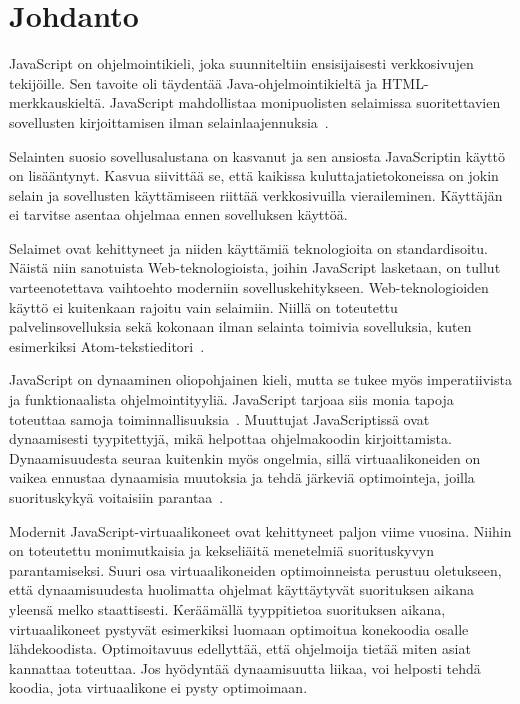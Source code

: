 \section{Johdanto}

JavaScript on ohjelmointikieli, joka suunniteltiin ensisijaisesti verkkosivujen tekijöille. Sen tavoite oli täydentää Java-ohjelmointikieltä ja HTML-merkkauskieltä. JavaScript mahdollistaa monipuolisten selaimissa suoritettavien sovellusten kirjoittamisen ilman selainlaajennuksia~\cite{paolini1994netscape}.

Selainten suosio sovellusalustana on kasvanut ja sen ansiosta JavaScriptin käyttö on lisääntynyt. Kasvua siivittää se, että kaikissa kuluttajatietokoneissa on jokin selain ja sovellusten käyttämiseen riittää verkkosivuilla vieraileminen. Käyttäjän ei tarvitse asentaa ohjelmaa ennen sovelluksen käyttöä.

Selaimet ovat kehittyneet ja niiden käyttämiä teknologioita on standardisoitu. Näistä niin sanotuista Web-teknologioista, joihin JavaScript lasketaan, on tullut varteenotettava vaihtoehto moderniin sovelluskehitykseen. Web-teknologioiden käyttö ei kuitenkaan rajoitu vain selaimiin. Niillä on toteutettu palvelinsovelluksia sekä kokonaan ilman selainta toimivia sovelluksia, kuten esimerkiksi Atom-tekstieditori~\cite{atom}.

JavaScript on dynaaminen oliopohjainen kieli, mutta se tukee myös imperatiivista ja funktionaalista ohjelmointityyliä. JavaScript tarjoaa siis monia tapoja toteuttaa samoja toiminnallisuuksia~\cite[4.2.1.]{es6}. Muuttujat JavaScriptissä ovat dynaamisesti tyypitettyjä, mikä helpottaa ohjelmakoodin kirjoittamista. Dynaamisuudesta seuraa kuitenkin myös ongelmia, sillä virtuaalikoneiden on vaikea ennustaa dynaamisia muutoksia ja tehdä järkeviä optimointeja, joilla suorituskykyä voitaisiin parantaa~\cite[s.~497]{Ahn2014}.

Modernit JavaScript-virtuaalikoneet ovat kehittyneet paljon viime vuosina. Niihin on toteutettu monimutkaisia ja kekseliäitä menetelmiä suorituskyvyn parantamiseksi. Suuri osa virtuaalikoneiden optimoinneista perustuu oletukseen, että dynaamisuudesta huolimatta ohjelmat käyttäytyvät suorituksen aikana yleensä melko staattisesti. Keräämällä tyyppitietoa suorituksen aikana, virtuaalikoneet pystyvät esimerkiksi luomaan optimoitua konekoodia osalle lähdekoodista. Optimoitavuus edellyttää, että ohjelmoija tietää miten asiat kannattaa toteuttaa. Jos hyödyntää dynaamisuutta liikaa, voi helposti tehdä koodia, jota virtuaalikone ei pysty optimoimaan.

